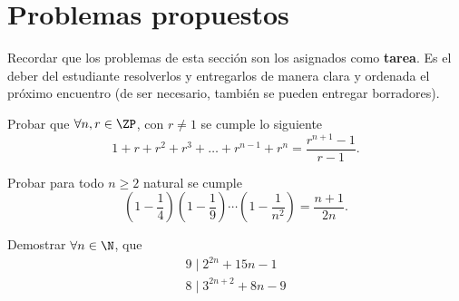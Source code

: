 \section{Problemas propuestos}

Recordar que los problemas de esta sección son los asignados como \textbf{tarea}.
Es el deber del estudiante resolverlos y entregarlos de manera clara y ordenada el próximo encuentro
(de ser necesario, también se pueden entregar borradores).

\begin{section-problem}
    Probar que $\forall n, r \in \ZP$, con $r \neq 1$ se cumple lo siguiente
    \[1 + r + r^2 + r^3 + \dots + r^{n-1} + r^n = \frac{r^{n + 1} - 1}{r - 1}.\]
\end{section-problem}

\begin{section-problem}
    Probar para todo $n\geq 2$ natural se cumple
    \[\left(1 - \frac{1}{4}\right) \left(1 - \frac{1}{9}\right) \cdots \left(1 - \frac{1}{n^2}\right) = \frac{n + 1}{2n}.\]
\end{section-problem}

\begin{section-problem}
    Demostrar $\forall n \in \N$, que
    \begin{gather*}
        9 \mid 2^{2n} + 15n - 1 \\
        8 \mid 3^{2n + 2} + 8n - 9
    \end{gather*}
\end{section-problem}
